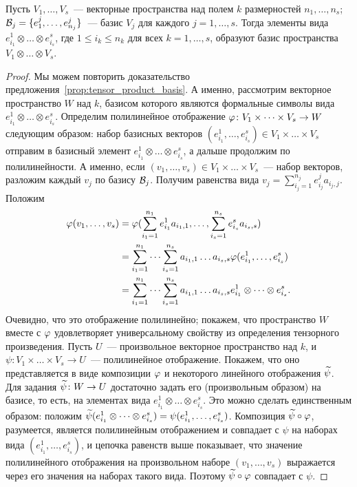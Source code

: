 \begin{proposition}
Пусть $V_1,\dots,V_s$~--- векторные пространства над полем $k$
размерностей $n_1,\dots,n_s$;
$\mathcal B_j=\{e^j_1,\dots,e^j_{n_j}\}$~--- базис $V_j$ для каждого
$j=1,\dots,s$.
Тогда элементы вида $e^1_{i_1}\otimes\dots\otimes e^s_{i_s}$, где
$1\leq i_k\leq n_k$ для всех $k=1,\dots,s$, образуют базис
пространства $V_1\otimes\dots\otimes V_s$.
\end{proposition}
\begin{proof}
Мы можем повторить доказательство
предложения~\ref{prop:tensor_product_basis}. А именно, рассмотрим
векторное пространство $W$ над $k$, базисом которого являются формальные
символы вида $e^1_{i_1}\otimes\dots\otimes e^s_{i_s}$. Определим
полилинейное отображение $\varphi\colon V_1\times\dots\times V_s\to W$
следующим образом: набор базисных векторов
$(e^1_{i_1},\dots,e^s_{i_s})\in V_1\times\dots\times V_s$
отправим в базисный элемент $e^1_{i_1}\otimes\dots\otimes e^s_{i_s}$,
а дальше продолжим по полилинейности.
А именно,
если $(v_1,\dots,v_s)\in V_1\times\dots\times V_s$~--- набор
векторов, разложим каждый $v_j$ по базису $\mathcal B_j$. Получим равенства
вида $v_j = \sum_{i_j=1}^{n_j} e^j_{i_j} a_{i_j,j}$.
Положим
\begin{align*}
\varphi(v_1,\dots,v_s) &= \varphi(\sum_{i_1=1}^{n_1} e^1_{i_1}a_{i_1,1},
\dots,\sum_{i_s=1}^{n_s} e^s_{i_s}a_{i_s,s}) \\
&= \sum_{i_1=1}^{n_1}\dots\sum_{i_s=1}^{n_s}a_{i_1,1}\dots
a_{i_s,s}\varphi(e^1_{i_1},\dots,e^s_{i_s}) \\
& = \sum_{i_1=1}^{n_1}\dots\sum_{i_s=1}^{n_s}a_{i_1,1}\dots
a_{i_s,s} e^1_{i_1}\otimes\dots\otimes e^s_{i_s}.
\end{align*}
Очевидно, что это отображение полилинейно; покажем, что пространство
$W$ вместе с $\varphi$ удовлетворяет универсальному свойству из
определения тензорного произведения. Пусть $U$~--- произвольное
векторное пространство над $k$, и
$\psi\colon V_1\times\dots\times V_s\to U$~--- полилинейное
отображение. Покажем, что оно представляется в виде композиции $\varphi$ и
некоторого линейного отображения $\widetilde\psi$.
Для задания $\widetilde\psi\colon W\to U$ достаточно задать его
(произвольным образом) на базисе, то есть, на элементах вида
$e^1_{i_1}\otimes\dots\otimes e^s_{i_s}$. Это можно сделать
единственным образом:
положим $\widetilde\psi(e^1_{i_1}\otimes\dots\otimes e^s_{i_s})
= \psi(e^1_{i_1},\dots, e^s_{i_s})$. Композиция $\widetilde\psi\circ\varphi$,
разумеется, является полилинейным отображением и
совпадает с $\psi$ на наборах вида $(e^1_{i_1},\dots,e^s_{i_s})$, и
цепочка равенств выше показывает, что значение полилинейного
отображения на произвольном наборе $(v_1,\dots,v_s)$ выражается через
его значения на наборах такого вида. Поэтому $\widetilde\psi\circ\varphi$
совпадает с $\psi$. 
\end{proof}


